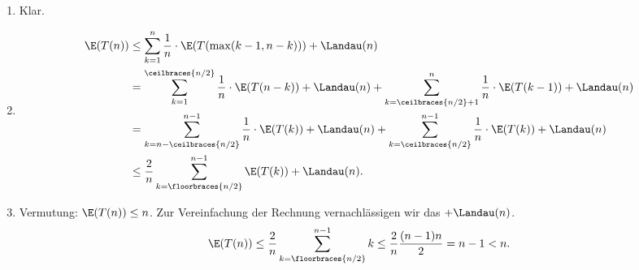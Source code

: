 \begin{solution}

\phantom{}

\begin{enumerate}[label = \alph*)]
  \item Klar.
  \item
  \begin{align*}
    \E(T(n)) &\leq \sum_{k=1}^n \frac{1}{n} \cdot \E(T(\max(k-1,n-k))) + \Landau(n) \\
    &= \sum_{k=1}^{\ceilbraces{n/2}} \frac{1}{n} \cdot \E(T(n-k)) + \Landau(n)
    + \sum_{k=\ceilbraces{n/2} + 1}^{n} \frac{1}{n} \cdot \E(T(k-1)) + \Landau(n) \\
    &= \sum_{k=n - \ceilbraces{n/2}}^{n - 1} \frac{1}{n} \cdot \E(T(k)) + \Landau(n)
    + \sum_{k=\ceilbraces{n/2} }^{n - 1} \frac{1}{n} \cdot \E(T(k)) + \Landau(n) \\
    &\leq \frac{2}{n}\sum_{k=\floorbraces{n/2} }^{n - 1} \E(T(k)) + \Landau(n).
  \end{align*}
  \item Vermutung: $\E(T(n)) \leq n$. Zur Vereinfachung der Rechnung vernachlässigen wir
  das $+ \Landau(n)$.
  \begin{align*}
    \E(T(n)) \leq \frac{2}{n}\sum_{k=\floorbraces{n/2} }^{n - 1} k \leq \frac{2}{n}\frac{(n-1)n}{2}
    = n - 1 < n.
  \end{align*}
\end{enumerate}

\end{solution}
